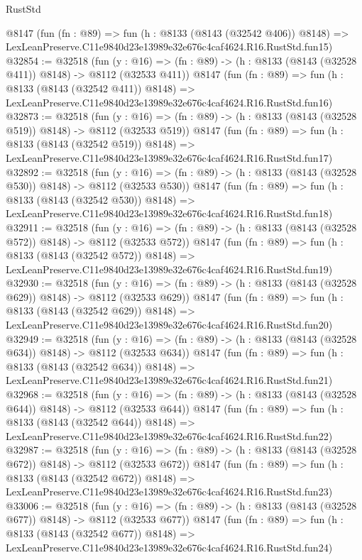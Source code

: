 \begin{lexlean}{RustStd}
\begin{coremodule}
    @8147
    (fun (fn : @89) =>
    fun (h : @8133 (@8143 (@32542 @406)) @8148) =>
    LexLeanPreserve.C11e9840d23e13989e32e676c4caf4624.R16.RustStd.fun15)
@32854 := @32518
    (fun (y : @16) => (fn : @89) -> (h : @8133 (@8143 (@32528 @411)) @8148) -> @8112 (@32533 @411))
    @8147
    (fun (fn : @89) =>
    fun (h : @8133 (@8143 (@32542 @411)) @8148) =>
    LexLeanPreserve.C11e9840d23e13989e32e676c4caf4624.R16.RustStd.fun16)
@32873 := @32518
    (fun (y : @16) => (fn : @89) -> (h : @8133 (@8143 (@32528 @519)) @8148) -> @8112 (@32533 @519))
    @8147
    (fun (fn : @89) =>
    fun (h : @8133 (@8143 (@32542 @519)) @8148) =>
    LexLeanPreserve.C11e9840d23e13989e32e676c4caf4624.R16.RustStd.fun17)
@32892 := @32518
    (fun (y : @16) => (fn : @89) -> (h : @8133 (@8143 (@32528 @530)) @8148) -> @8112 (@32533 @530))
    @8147
    (fun (fn : @89) =>
    fun (h : @8133 (@8143 (@32542 @530)) @8148) =>
    LexLeanPreserve.C11e9840d23e13989e32e676c4caf4624.R16.RustStd.fun18)
@32911 := @32518
    (fun (y : @16) => (fn : @89) -> (h : @8133 (@8143 (@32528 @572)) @8148) -> @8112 (@32533 @572))
    @8147
    (fun (fn : @89) =>
    fun (h : @8133 (@8143 (@32542 @572)) @8148) =>
    LexLeanPreserve.C11e9840d23e13989e32e676c4caf4624.R16.RustStd.fun19)
@32930 := @32518
    (fun (y : @16) => (fn : @89) -> (h : @8133 (@8143 (@32528 @629)) @8148) -> @8112 (@32533 @629))
    @8147
    (fun (fn : @89) =>
    fun (h : @8133 (@8143 (@32542 @629)) @8148) =>
    LexLeanPreserve.C11e9840d23e13989e32e676c4caf4624.R16.RustStd.fun20)
@32949 := @32518
    (fun (y : @16) => (fn : @89) -> (h : @8133 (@8143 (@32528 @634)) @8148) -> @8112 (@32533 @634))
    @8147
    (fun (fn : @89) =>
    fun (h : @8133 (@8143 (@32542 @634)) @8148) =>
    LexLeanPreserve.C11e9840d23e13989e32e676c4caf4624.R16.RustStd.fun21)
@32968 := @32518
    (fun (y : @16) => (fn : @89) -> (h : @8133 (@8143 (@32528 @644)) @8148) -> @8112 (@32533 @644))
    @8147
    (fun (fn : @89) =>
    fun (h : @8133 (@8143 (@32542 @644)) @8148) =>
    LexLeanPreserve.C11e9840d23e13989e32e676c4caf4624.R16.RustStd.fun22)
@32987 := @32518
    (fun (y : @16) => (fn : @89) -> (h : @8133 (@8143 (@32528 @672)) @8148) -> @8112 (@32533 @672))
    @8147
    (fun (fn : @89) =>
    fun (h : @8133 (@8143 (@32542 @672)) @8148) =>
    LexLeanPreserve.C11e9840d23e13989e32e676c4caf4624.R16.RustStd.fun23)
@33006 := @32518
    (fun (y : @16) => (fn : @89) -> (h : @8133 (@8143 (@32528 @677)) @8148) -> @8112 (@32533 @677))
    @8147
    (fun (fn : @89) =>
    fun (h : @8133 (@8143 (@32542 @677)) @8148) =>
    LexLeanPreserve.C11e9840d23e13989e32e676c4caf4624.R16.RustStd.fun24)

\end{coremodule}
\end{lexlean}
